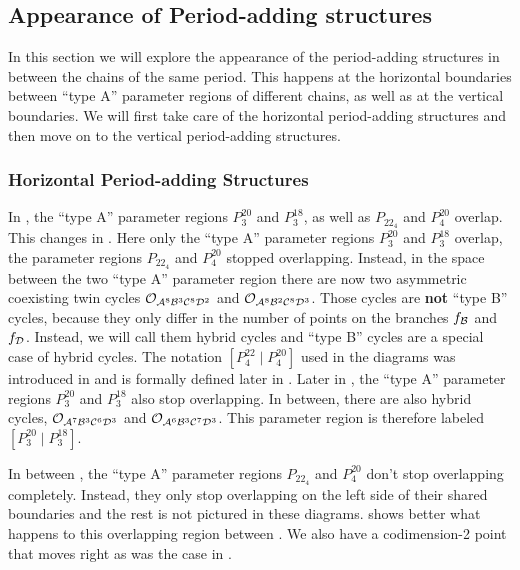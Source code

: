 \subsection{Appearance of Period-adding structures}

In this section we will explore the appearance of the period-adding structures in between the chains of the same period.
This happens at the horizontal boundaries between ``type A'' parameter regions of different chains, as well as at the vertical boundaries.
We will first take care of the horizontal period-adding structures and then move on to the vertical period-adding structures.

\subsubsection{Horizontal Period-adding Structures}

In , the ``type A'' parameter regions $P^{20}_3$ and $P^{18}_3$, as well as $P_{22}_4$ and $P^{20}_4$ overlap.
This changes in .
Here only the ``type A'' parameter regions $P^{20}_3$ and $P^{18}_3$ overlap, the parameter regions $P_{22}_4$ and $P^{20}_4$ stopped overlapping.
Instead, in the space between the two ``type A'' parameter region there are now two asymmetric coexisting twin cycles $\mathcal{O}_{\mathcal{A}^8\mathcal{B}^3\mathcal{C}^8\mathcal{D}^2}$ and $\mathcal{O}_{\mathcal{A}^8\mathcal{B}^2\mathcal{C}^8\mathcal{D}^3}$.
Those cycles are \textbf{not} ``type B'' cycles, because they only differ in the number of points on the branches $f_{\mathcal{B}}$ and $f_{\mathcal{D}}$.
Instead, we will call them hybrid cycles and ``type B'' cycles are a special case of hybrid cycles.
The notation $\left[P^{22}_4 \mid P^{20}_4\right]$ used in the diagrams was introduced in  and is formally defined later in .
Later in , the ``type A'' parameter regions $P^{20}_3$ and $P^{18}_3$ also stop overlapping.
In between, there are also hybrid cycles, $\mathcal{O}_{\mathcal{A}^7\mathcal{B}^3\mathcal{C}^6\mathcal{D}^3}$ and $\mathcal{O}_{\mathcal{A}^6\mathcal{B}^3\mathcal{C}^7\mathcal{D}^3}$.
This parameter region is therefore labeled $\left[P^{20}_3 \mid P^{18}_3\right]$.

In between , the ``type A'' parameter regions $P_{22}_4$ and $P^{20}_4$ don't stop overlapping completely.
Instead, they only stop overlapping on the left side of their shared boundaries and the rest is not pictured in these diagrams.
 shows better what happens to this overlapping region between .
We also have a codimension-2 point that moves right as was the case in .

